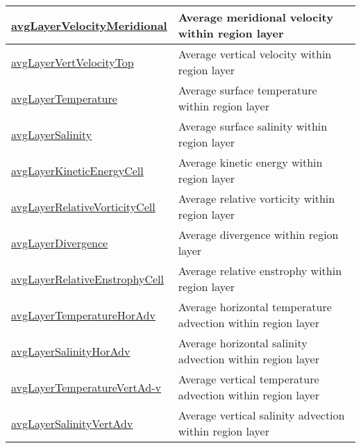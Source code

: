 {\begin{center}
\begin{longtable}{| p{2.0in} | p{4.0in} |}
    \hline
    \hyperref[subsec:var_sec_layerVolumeWeightedAverageAM_avgLayerVelocityMeridional]{avgLayerVelocityMeridional} & Average meridional velocity within region layer \\
    \hline
    \hyperref[subsec:var_sec_layerVolumeWeightedAverageAM_avgLayerVertVelocityTop]{avgLayerVertVelocityTop} & Average vertical velocity within region layer \\
    \hline
    \hyperref[subsec:var_sec_layerVolumeWeightedAverageAM_avgLayerTemperature]{avgLayerTemperature} & Average surface temperature within region layer \\
    \hline
    \hyperref[subsec:var_sec_layerVolumeWeightedAverageAM_avgLayerSalinity]{avgLayerSalinity} & Average surface salinity within region layer \\
    \hline
    \hyperref[subsec:var_sec_layerVolumeWeightedAverageAM_avgLayerKineticEnergyCell]{avgLayerKineticEnergyCell} & Average kinetic energy within region layer \\
    \hline
    \hyperref[subsec:var_sec_layerVolumeWeightedAverageAM_avgLayerRelativeVorticityCell]{avgLayerRelativeVorticityCell} & Average relative vorticity within region layer \\
    \hline
    \hyperref[subsec:var_sec_layerVolumeWeightedAverageAM_avgLayerDivergence]{avgLayerDivergence} & Average divergence within region layer \\
    \hline
    \hyperref[subsec:var_sec_layerVolumeWeightedAverageAM_avgLayerRelativeEnstrophyCell]{avgLayerRelativeEnstrophyCell} & Average relative enstrophy within region layer \\
    \hline
    \hyperref[subsec:var_sec_layerVolumeWeightedAverageAM_avgLayerTemperatureHorAdv]{avgLayerTemperatureHorAdv} & Average horizontal temperature advection within region layer \\
    \hline
    \hyperref[subsec:var_sec_layerVolumeWeightedAverageAM_avgLayerSalinityHorAdv]{avgLayerSalinityHorAdv} & Average horizontal salinity advection within region layer \\
    \hline
    \hyperref[subsec:var_sec_layerVolumeWeightedAverageAM_avgLayerTemperatureVertAdv]{avgLayerTemperatureVertAd-}\hyperref[subsec:var_sec_layerVolumeWeightedAverageAM_avgLayerTemperatureVertAdv]{v}  & Average vertical temperature advection within region layer \\
    \hline
    \hyperref[subsec:var_sec_layerVolumeWeightedAverageAM_avgLayerSalinityVertAdv]{avgLayerSalinityVertAdv} & Average vertical salinity advection within region layer \\

\end{longtable}
\end{center}}
